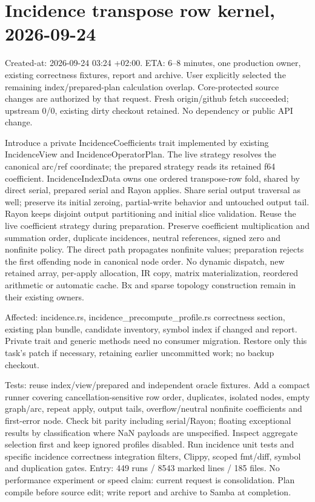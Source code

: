 \documentclass[11pt,a4paper]{article}
\begin{document}
\section*{Incidence transpose row kernel, 2026-09-24}
Created-at: 2026-09-24 03:24 +02:00. ETA: 6--8 minutes, one production owner,
existing correctness fixtures, report and archive. User explicitly selected the
remaining index/prepared-plan calculation overlap. Core-protected source changes
are authorized by that request. Fresh origin/github fetch succeeded; upstream
0/0, existing dirty checkout retained. No dependency or public API change.

Introduce a private IncidenceCoefficients trait implemented by existing
IncidenceView and IncidenceOperatorPlan. The live strategy resolves the canonical
arc/ref coordinate; the prepared strategy reads its retained f64 coefficient.
IncidenceIndexData owns one ordered transpose-row fold, shared by direct serial,
prepared serial and Rayon applies. Share serial output traversal as well; preserve
its initial zeroing, partial-write behavior and untouched output tail. Rayon keeps
disjoint output partitioning and initial slice validation. Reuse the live coefficient
strategy during preparation. Preserve coefficient multiplication and summation
order, duplicate incidences, neutral references, signed zero and nonfinite policy.
The direct path propagates nonfinite values; preparation rejects the first offending
node in canonical node order. No dynamic dispatch, new retained array, per-apply
allocation, IR copy, matrix materialization, reordered arithmetic or automatic cache.
Bx and sparse topology construction remain in their existing owners.

Affected: incidence.rs, incidence\_precompute\_profile.rs correctness section,
existing plan bundle, candidate inventory, symbol index if changed and report.
Private trait and generic methods need no consumer migration. Restore only this
task's patch if necessary, retaining earlier uncommitted work; no backup checkout.

Tests: reuse index/view/prepared and independent oracle fixtures. Add a compact
runner covering cancellation-sensitive row order, duplicates, isolated nodes,
empty graph/arc, repeat apply, output tails, overflow/neutral nonfinite coefficients
and first-error node. Check bit parity including serial/Rayon; floating exceptional
results by classification where NaN payloads are unspecified. Inspect aggregate
selection first and keep ignored profiles disabled. Run incidence unit tests and
specific incidence correctness integration filters, Clippy, scoped fmt/diff,
symbol and duplication gates. Entry: 449 runs / 8543 marked lines / 185 files.
No performance experiment or speed claim: current request is consolidation.
Plan compile before source edit; write report and archive to Samba at completion.
\end{document}
